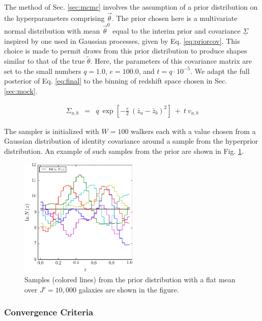 \documentclass[preprint]{aastex}
\newcommand{\textul}{\underline}
\begin{document}
The method of Sec. \ref{sec:mcmc} involves the assumption of a prior 
distribution on the hyperparameters comprising $\vec{\theta}$.  The prior 
chosen here is a multivariate normal distribution with mean $\vec{\theta}^{0}$ 
equal to the interim prior and covariance $\textul{\Sigma}$ inspired by one 
used in Gaussian processes, given by Eq. \ref{eq:priorcov}.  This choice is 
made to permit draws from this prior distribution to produce shapes similar to 
that of the true $\tilde{\theta}$.  Here, the parameters of this covariance 
matrix are set to the small numbers $q=1.0$, $e=100.0$, and $t=q\cdot10^{-5}$.  
We adapt the full posterior of Eq. \ref{eq:final} to the binning of redshift 
space chosen in Sec. \ref{sec:mock}.

\begin{eqnarray}
\label{eq:priorcov}
\Sigma_{a,b} &=& q\ \exp[-\frac{e}{2}\ (\bar{z}_{a}-\bar{z}_{b})^{2}]\ +\ t\ 
v_{a,b}
\end{eqnarray}

The sampler is initialized with $W=100$ walkers each with a value chosen from a 
Gaussian distribution of identity covariance around a sample from the 
hyperprior distribution.  An example of such samples from the prior are shown 
in Fig. \ref{fig:prior}.

\begin{figure}
\includegraphics[width=0.5\textwidth]{figs/null/priorsamps.png}
\caption{Samples (colored lines) from the prior distribution with a flat mean 
over $J'=10,000$ galaxies are shown in the figure.}
\label{fig:prior}
\end{figure}

\subsubsection{Convergence Criteria}
\label{sec:acorr}
\end{document}
